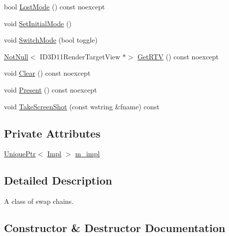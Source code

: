 \begin{DoxyCompactItemize}
\item 
bool \mbox{\hyperlink{classmage_1_1rendering_1_1_swap_chain_a8d4356d1652fca65095bc4db2bd0c1f2}{Lost\+Mode}} () const noexcept
\item 
void \mbox{\hyperlink{classmage_1_1rendering_1_1_swap_chain_a7ceec40e9007d1d6be3bdcd003fe9985}{Set\+Initial\+Mode}} ()
\item 
void \mbox{\hyperlink{classmage_1_1rendering_1_1_swap_chain_a184b5aa11bdc69f7b6077de9ec0c47e0}{Switch\+Mode}} (bool toggle)
\item 
\mbox{\hyperlink{namespacemage_a8769f9d670d6b585ea306cb1062af94b}{Not\+Null}}$<$ I\+D3\+D11\+Render\+Target\+View $\ast$$>$ \mbox{\hyperlink{classmage_1_1rendering_1_1_swap_chain_afa9c115a04dac008228c668169dd8bd5}{Get\+R\+TV}} () const noexcept
\item 
void \mbox{\hyperlink{classmage_1_1rendering_1_1_swap_chain_ab834da2afc837fe4c113f86c300af264}{Clear}} () const noexcept
\item 
void \mbox{\hyperlink{classmage_1_1rendering_1_1_swap_chain_a6739d35cf37b6d50adc70eb09cba2446}{Present}} () const noexcept
\item 
void \mbox{\hyperlink{classmage_1_1rendering_1_1_swap_chain_a833d4eb8c091c49aaedaa3f3a2e6c159}{Take\+Screen\+Shot}} (const wstring \&fname) const
\end{DoxyCompactItemize}
\subsection*{Private Attributes}
\begin{DoxyCompactItemize}
\item 
\mbox{\hyperlink{namespacemage_a3316d7143a973e37adf1110f2e80ca31}{Unique\+Ptr}}$<$ \mbox{\hyperlink{classmage_1_1rendering_1_1_swap_chain_1_1_impl}{Impl}} $>$ \mbox{\hyperlink{classmage_1_1rendering_1_1_swap_chain_a983645d6494b7e731753def5356bb8e6}{m\+\_\+impl}}
\end{DoxyCompactItemize}


\subsection{Detailed Description}
A class of swap chains. 

\subsection{Constructor \& Destructor Documentation}
\mbox{\label{classmage_1_1rendering_1_1_swap_chain_a711f0c9750a2ff68a71bb9e333b2eba7}} 
